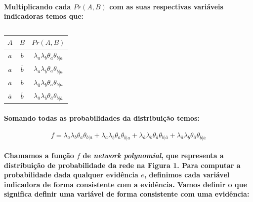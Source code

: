 \documentclass[a4paper,10pt]{article}
\theoremstyle{plain}
\begin{document}
\newpage

\paragraph{
  Multiplicando cada $Pr(A, B)$ com as suas respectivas variáveis indicadoras temos que:
}

\begin{table}[h]
\begin{center}
\captionsetup{justification=centering}
\caption{}
\begin{tabular}{c c | c}
$A$ & $B$ & $Pr(A, B)$ \\
\hline
$a$ & $b$ & $\lambda_{a}\lambda_{b}\theta_{a}\theta_{b|a}$ \\
$a$ & $\overline{b}$ & $\lambda_{a}\lambda_{\overline{b}}\theta_{a}\theta_{\overline{b}|a}$ \\
$\overline{a}$ & $b$ & $\lambda_{\overline{a}}\lambda_{b}\theta_{\overline{a}}\theta_{b|\overline{a}}$ \\
$\overline{a}$ & $\overline{b}$ & $\lambda_{\overline{a}}\lambda_{\overline{b}}\theta_{\overline{a}}\theta_{\overline{b}|\overline{a}}$ \\
\end{tabular}
\end{center}
\end{table}

\paragraph{
  Somando todas as probabilidades da distribuição temos:
}

\begin{equation}
f = \lambda_{a}\lambda_{b}\theta_{a}\theta_{b|a} + 
  \lambda_{a}\lambda_{\overline{b}}\theta_{a}\theta_{\overline{b}|a} +
  \lambda_{\overline{a}}\lambda_{b}\theta_{\overline{a}}\theta_{b|\overline{a}} +  
  \lambda_{\overline{a}}\lambda_{\overline{b}}\theta_{\overline{a}}\theta_{\overline{b}|\overline{a}}
\end{equation}

\paragraph{
  Chamamos a função $f$ de \textit{network polynomial}, que representa a distribuição de 
probabilidade da rede na Figura 1. Para computar a probabilidade dada qualquer evidência $e$,
definimos cada variável indicadora de forma consistente com a evidência. Vamos definir o que
significa definir uma variável de forma consistente com uma evidência:
}
\end{document}
